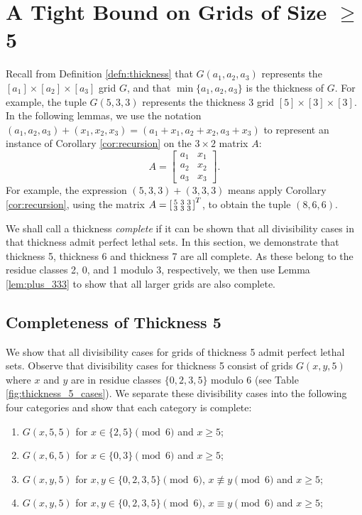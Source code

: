 \chapter{A Tight Bound on Grids of Size $\geq$ 5}

Recall from Definition \ref{defn:thickness} that $G(a_1,a_2,a_3)$ represents the $[a_1] \times [a_2] \times [a_3]$ grid $G$, and that $\min\{a_1,a_2,a_3\}$ is the thickness of $G$. For example, the tuple $G(5,3,3)$ represents the thickness 3 grid $[5] \times [3] \times [3]$. In the following lemmas, we use the notation $(a_1,a_2,a_3)+(x_1,x_2,x_3) = (a_1+x_1, a_2+x_2, a_3+x_3)$ to represent an instance of Corollary \ref{cor:recursion} on the $3 \times 2$ matrix $A$:
$$A =
\begin{bmatrix}
a_1 & x_1 \\
a_2 & x_2 \\
a_3 & x_3
\end{bmatrix}.
$$
For example, the expression $(5,3,3) + (3,3,3)$ means apply Corollary \ref{cor:recursion}, using the matrix $A = \begin{bsmallmatrix} 5&3&3 \\ 3&3&3 \end{bsmallmatrix}^T$, to obtain the tuple $(8,6,6)$. 

We shall call a thickness \emph{complete} if it can be shown that all divisibility cases in that thickness admit perfect lethal sets. In this section, we demonstrate that thickness 5, thickness 6 and thickness 7 are all complete. As these belong to the residue classes 2, 0, and 1 modulo 3, respectively, we then use Lemma \ref{lem:plus_333} to show that all larger grids are also complete. 

\section{Completeness of Thickness 5}
We show that all divisibility cases for grids of thickness 5 admit perfect lethal sets. Observe that divisibility cases for thickness 5 consist of grids $G(x,y,5)$ where $x$ and $y$ are in residue classes $\{0,2,3,5\}$ modulo 6 (see Table \ref{fig:thickness_5_cases}). We separate these divisibility cases into the following four categories and show that each category is complete:

\begin{enumerate}
\item $G(x,5,5)$ for $x \in \{2,5\} \pmod 6$ and $x \geq 5$;
\item $G(x,6,5)$ for $x \in \{0,3\} \pmod 6$ and $x \geq 5$;
\item $G(x,y,5)$ for $x,y \in \{0,2,3,5\} \pmod 6$, $x \not\equiv y \pmod 6$ and $x \geq 5$;
\item $G(x,y,5)$ for $x,y \in \{0,2,3,5\} \pmod 6$, $x \equiv y \pmod 6$ and $x \geq 5$;
\end{enumerate}

